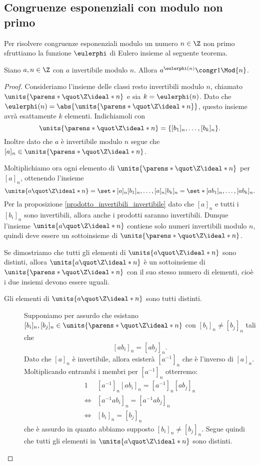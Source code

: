\subsection{Congruenze esponenziali con modulo non primo}

Per risolvere congruenze esponenziali modulo un numero $n \in \Z$ non primo sfruttiamo la funzione $\eulerphi$ di Eulero insieme al seguente teorema.

\begin{theorem}
     \label{th_Eulero}
    Siano $a, n \in \Z$ con $a$ invertibile modulo $n$. Allora $a^{\eulerphi(n)} \congr 1 \Mod{n}$.
\end{theorem}
\begin{proof}
    Consideriamo l'insieme delle classi resto invertibili modulo $n$, chiamato $\units{\parens*{\Zmod{n}}}$ e sia $k = \eulerphi(n)$. Dato che $\eulerphi(n) = \abs{\units{\parens*{\Zmod{n}}}}$, questo insieme avrà esattamente $k$ elementi. Indichiamoli con \[
        \units{\parens*{\Zmod{n}}} = \{[b_1]_n, \dots, [b_k]_n\}.   
    \]
    Inoltre dato che $a$ è invertibile modulo $n$ segue che $[a]_n \in \units{\parens*{\Zmod{n}}}$. 

    Moltiplichiamo ora ogni elemento di $\units{\parens*{\Zmod{n}}}$ per $[a]_n$, ottenendo l'insieme \[
        \units{a\Zmod{n}} = \set*{ [a]_n[b_1]_n, \dots, [a]_n[b_k]_n } = \set*{ [ab_1]_n, \dots, [ab_k]_n }.
    \]
    Per la proposizione \ref{prodotto_invertibili_invertibile} dato che $[a]_n$ e tutti i $[b_i]_n$ sono invertibili, allora anche i prodotti saranno invertibili. Dunque l'insieme $\units{a\Zmod{n}}$ contiene solo numeri invertibili modulo $n$, quindi deve essere un sottoinsieme di $\units{\parens*{\Zmod{n}}}$.

    Se dimostriamo che tutti gli elementi di $\units{a\Zmod{n}}$ sono distinti, allora $\units{a\Zmod{n}}$ è un sottoinsieme di $\units{\parens*{\Zmod{n}}}$ con il suo stesso numero di elementi, cioè i due insiemi devono essere uguali.

    \begin{description}
        \item[Gli elementi di $\units{a\Zmod{n}}$ sono tutti distinti.] Supponiamo per assurdo che esistano $[b_i]_n, [b_j]_n \in \units{\parens*{\Zmod{n}}}$ con $[b_i]_n \neq [b_j]_n$ tali che \[
            [ab_i]_n = [ab_j]_n.
        \]
        Dato che $[a]_n$ è invertibile, allora esisterà $[a^{-1}]_n$ che è l'inverso di $[a]_n$. Moltiplicando entrambi i membri per $[a^{-1}]_n$ otterremo: \begin{alignat*}
            {1}
            &[a^{-1}]_n[ab_i]_n = [a^{-1}]_n[ab_j]_n \\
            \iff &[a^{-1}ab_i]_n = [a^{-1}ab_j]_n \\
            \iff &[b_i]_n = [b_j]_n 
        \end{alignat*}
        che è assurdo in quanto abbiamo supposto $[b_i]_n \neq [b_j]_n$. Segue quindi che tutti gli elementi in $\units{a\Zmod{n}}$ sono distinti.
    \end{description}


\end{proof}
